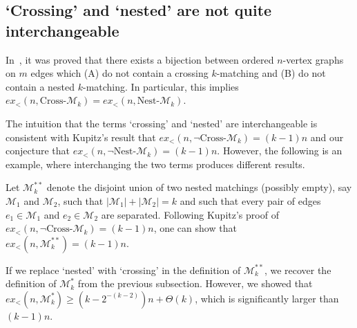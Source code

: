 \documentclass[11pt]{article}
\theoremstyle{definition}
\begin{document}
\subsection{`Crossing' and `nested' are not quite interchangeable}

In~\cite{kathe}, it was proved that there exists a bijection between ordered $n$-vertex graphs on $m$ edges which (A) do not contain a crossing $k$-matching and (B) do not contain a nested $k$-matching.      
In particular, this implies $ex_<(n,\text{Cross-}\mathcal M_k)=ex_<(n,\text{Nest-}\mathcal M_k)$.

The intuition that the terms `crossing' and `nested' are interchangeable is consistent with Kupitz's result that $ex_<(n,\neg\text{Cross-}\mathcal M_k)=(k-1)n$ and our conjecture that $ex_<(n,\neg\text{Nest-}\mathcal M_k)=(k-1)n$.
However, the following is an example, where interchanging the two terms produces different results.

Let $\mathcal M^{**}_k$ denote the disjoint union of two nested matchings (possibly empty), say $\mathcal M_1$ and $\mathcal M_2$, such that $|\mathcal M_1|+|\mathcal M_2|=k$ and such that every pair of edges $e_1\in\mathcal M_1$ and $e_2\in\mathcal M_2$ are separated.
Following Kupitz's proof of $ex_<(n,\neg\text{Cross-}\mathcal M_k)=(k-1)n$, one can show that $ex_<(n,\mathcal M^{**}_k)=(k-1)n$. 

If we replace `nested' with `crossing' in the definition of $\mathcal M^{**}_k$, we recover the definition of $\mathcal M^*_k$ from the previous subsection.
However, we showed that $ex_<(n,\mathcal M^*_k)\ge\left(k-2^{-(k-2)}\right)n + \Theta(k)$, which is significantly larger than $(k-1)n$.




\end{document}
